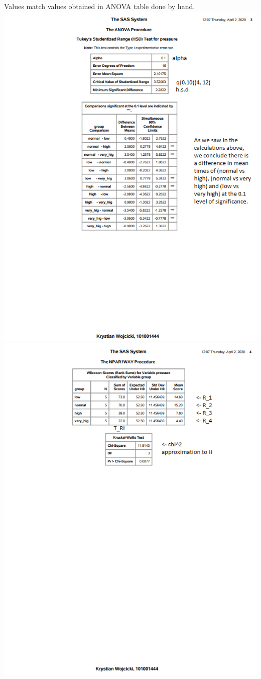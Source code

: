 \documentclass{article}
\begin{document}
\begin{enumerate}[1.]
\begin{center}
Values match values obtained in ANOVA table done by hand.
\includegraphics[scale=1]{a4_sas3}
\includegraphics[scale=1]{a4_sas4}
\end{center}


\end{enumerate}
\end{document}
